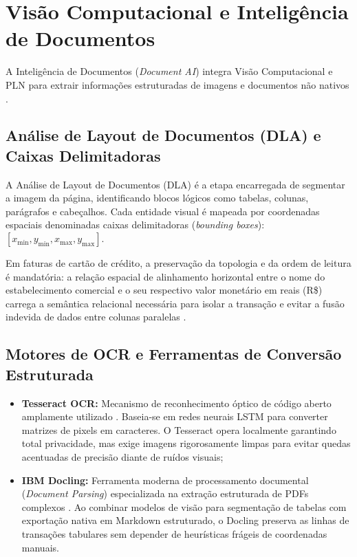 \documentclass[
	12pt,				
	openright,			
	oneside,			
	a4paper,			
	english,			
	brazil				
	]{abntex2}
\begin{document}
\section{Visão Computacional e Inteligência de Documentos}
\label{sec:fund_visao_ocr}

A Inteligência de Documentos (\textit{Document AI}) integra Visão Computacional e PLN para extrair informações estruturadas de imagens e documentos não nativos \cite{docling2024}.

\subsection{Análise de Layout de Documentos (DLA) e Caixas Delimitadoras}
A Análise de Layout de Documentos (DLA) é a etapa encarregada de segmentar a imagem da página, identificando blocos lógicos como tabelas, colunas, parágrafos e cabeçalhos. Cada entidade visual é mapeada por coordenadas espaciais denominadas caixas delimitadoras (\textit{bounding boxes}): $[x_{\min}, y_{\min}, x_{\max}, y_{\max}]$.

Em faturas de cartão de crédito, a preservação da topologia e da ordem de leitura é mandatória: a relação espacial de alinhamento horizontal entre o nome do estabelecimento comercial e o seu respectivo valor monetário em reais (R\$) carrega a semântica relacional necessária para isolar a transação e evitar a fusão indevida de dados entre colunas paralelas \cite{drumond2023analise}.

\subsection{Motores de OCR e Ferramentas de Conversão Estruturada}
\begin{itemize}
    \item \textbf{Tesseract OCR:} Mecanismo de reconhecimento óptico de código aberto amplamente utilizado \cite{smith2007overview}. Baseia-se em redes neurais LSTM para converter matrizes de pixels em caracteres. O Tesseract opera localmente garantindo total privacidade, mas exige imagens rigorosamente limpas para evitar quedas acentuadas de precisão diante de ruídos visuais;
    \item \textbf{IBM Docling:} Ferramenta moderna de processamento documental (\textit{Document Parsing}) especializada na extração estruturada de PDFs complexos \cite{docling2024}. Ao combinar modelos de visão para segmentação de tabelas com exportação nativa em Markdown estruturado, o Docling preserva as linhas de transações tabulares sem depender de heurísticas frágeis de coordenadas manuais.
\end{itemize}
\end{document}
